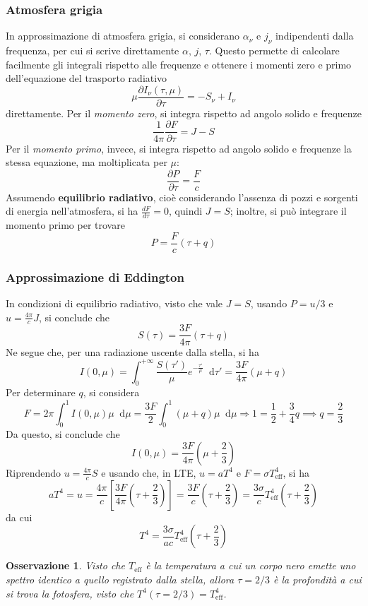 \documentclass[11pt, a4paper]{scrartcl}
\theoremstyle{style}
\newtheorem{osservazione}{Osservazione}[section]
\theoremstyle{style1}
\newcommand{\dd}{\mathop{}\!\mathrm{d}}
\numberwithin{equation}{subsection}
\begin{document}
\subsubsection{Atmosfera grigia}
In approssimazione di atmosfera grigia, si considerano $\alpha _\nu $ e $j_\nu $ indipendenti dalla frequenza, per cui si scrive direttamente $\alpha , \, j, \, \tau $. 
Questo permette di calcolare facilmente gli integrali rispetto alle frequenze e ottenere i momenti zero e primo dell'equazione del trasporto radiativo 
\[
\mu  \frac{\partial I_\nu (\tau, \mu )}{\partial \tau } = - S_\nu  + I_\nu 
\] 
direttamente.
Per il \textit{momento zero}, si integra rispetto ad angolo solido e frequenze
\begin{equation}
	\frac{1}{4\pi}\frac{\partial F}{\partial \tau } =  J  - S
\end{equation}
Per il \textit{momento primo}, invece, si integra rispetto ad angolo solido e frequenze la stessa equazione, ma moltiplicata per $\mu $: 
\begin{equation}
 \frac{\partial P}{\partial \tau } = \frac{F}{c}
\end{equation}
Assumendo \textbf{equilibrio radiativo}, cio\`e considerando l'assenza di pozzi e sorgenti di energia nell'atmosfera, si ha $\frac{d F}{d \tau } = 0$, quindi $ J = S$; inoltre, si pu\`o integrare il momento primo per trovare
\[
P = \frac{F}{c}(\tau +q)
\] 
\subsubsection{Approssimazione di Eddington}
In condizioni di equilibrio radiativo, visto che vale $J=S$, usando $P = u / 3 $ e $u = \frac{4\pi }{c} J $, si conclude che
\[
S(\tau ) = \frac{3F}{4\pi} (\tau  + q)
\] 
Ne segue che, per una radiazione uscente dalla stella, si ha
\begin{equation*}
	I(0,\mu )= \int _0^{+\infty} \frac{S(\tau ')}{\mu }e^{- \frac{\tau '}{\mu }}\dd \tau ' = \frac{3F}{4\pi}(\mu +q)
\end{equation*}
Per determinare $q$, si considera 
\[
F = 2\pi \int _{0}^{1} I(0,\mu ) \mu \dd \mu = \frac{3F}{2} \int _{0}^{1} (\mu +q)\mu  \dd \mu \Rightarrow 1 = \frac{1}{2} + \frac{3}{4}q\implies q = \frac{2}{3}
\] 
Da questo, si conclude che
\begin{equation}
	I(0,\mu ) =  \frac{3F}{4\pi}\left(\mu +\frac{2}{3}\right) 
\end{equation}
Riprendendo $u = \frac{4\pi}{c}S$ e usando che, in LTE, $u = a T^4$ e $F = \sigma T_\text{eff}^4$, si ha
\[
a  T^4=u = \frac{4\pi}{c} \left[\frac{3F}{4\pi}\left(\tau  + \frac{2}{3}\right) \right] = \frac{3F}{c}\left(\tau  + \frac{2}{3}\right) = \frac{3\sigma }{c}T_\text{eff}^4 \left(\tau  + \frac{2}{3}\right) 
\] 
da cui
\begin{equation}
	T^4 = \frac{3\sigma }{ac}T_\text{eff}^4 \left(\tau  + \frac{2}{3}\right) 
\end{equation}
\begin{osservazione}
Visto che $T_\text{eff}$ \`e la temperatura a cui un corpo nero emette uno spettro identico a quello registrato dalla stella, allora $\tau  = 2 / 3$ \`e la profondit\`a a cui si trova la \textit{fotosfera}, visto che $T^4(\tau  = 2 /3 ) = T^4 _\text{eff}$.
\end{osservazione}
\end{document}
